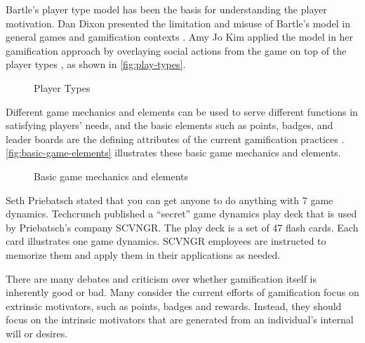 Bartle's player type model has been the basis for understanding the player motivation. Dan Dixon presented the limitation and misuse of Bartle's model in general games and gamification contexts \cite{DixonPlayerType}. Amy Jo Kim applied the model in her gamification approach by overlaying social actions from the game on top of the player types \cite {Kim2010}, as shown in \autoref{fig:play-types}.

\begin{figure}[ht!]
	\centering
		\caption{Player Types}
		\label{fig:play-types}
\end{figure}

Different game mechanics and elements can be used to serve different functions in satisfying players' needs, and the basic elements such as points, badges, and leader boards are the defining attributes of the current gamification practices \cite {Deterding2011dragon}. \autoref{fig:basic-game-elements}  illustrates these basic game mechanics and elements.

\begin{figure}[ht!]
	\centering
		\caption{Basic game mechanics and elements}
		\label{fig:basic-game-elements}
\end{figure}

Seth Priebatsch \cite {Priebatsch2010ted} stated that you can get anyone to do anything with 7 game dynamics. Techcrunch \cite{Biggs2010} published a ``secret'' game dynamics play deck that is used by Priebatsch's company SCVNGR. The play deck is a set of 47 flash cards. Each card illustrates one game dynamics. SCVNGR employees are instructed to memorize them and apply them in their applications as needed.  

There are many debates and criticism over whether gamification itself is inherently good or bad. 
Many consider the current efforts of gamification focus on extrinsic motivators, such as points, badges and rewards. Instead, they should focus on the intrinsic motivators that are generated from an individual's internal will or desires.

